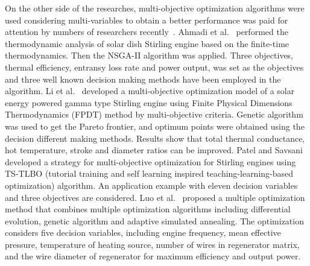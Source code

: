 \documentclass[preprint,5p, twocolumn]{elsarticle}
\begin{document}
On the other side of the researches, multi-objective optimization algorithms were used considering multi-variables to obtain a better performance was paid for attention by numbers of researchers recently~\cite{Ahmadi2016,Li2016b,Patel2016,Luo2016}.
Ahmadi et al.~\cite{Ahmadi2016} performed the thermodynamic analysis of solar dish Stirling engine based on the finite-time thermodynamics. Then the NSGA-II algorithm was applied. Three objectives, thermal efficiency, entransy loss rate and power output, was set as the objectives and three well known decision making methods have been employed in the algorithm.
Li et al.~\cite{Li2016b} developed a multi-objective optimization model of a solar energy powered gamma type Stirling engine using Finite Physical Dimensions Thermodynamics (FPDT) method by multi-objective criteria. Genetic algorithm was used to get the Pareto frontier, and optimum points were obtained using the decision different making methods. Results show that total thermal conductance, hot temperature, stroke and diameter ratios can be improved.
Patel and Savsani~\cite{Patel2016} developed a strategy for multi-objective optimization for Stirling engines using TS-TLBO (tutorial training and self learning inspired teaching-learning-based optimization) algorithm. An application example with eleven decision variables and three objectives are considered. 
Luo et al.~\cite{Luo2016} proposed a multiple optimization method that combines multiple optimization algorithms including differential evolution, genetic algorithm and adaptive simulated annealing. The optimization considers five decision variables, including engine frequency, mean effective pressure, temperature of heating source, number of wires in regenerator matrix, and the wire diameter of regenerator for maximum efficiency and output power.


\end{document}
